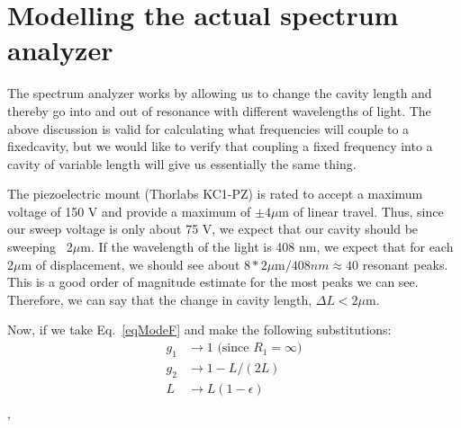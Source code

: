 \section{Modelling the actual spectrum analyzer}

The spectrum analyzer works by allowing us to change the cavity length and thereby go into and out of resonance with different wavelengths of light. The above discussion is valid for calculating what frequencies will couple to a fixedcavity, but we would like to verify that coupling a fixed frequency into a cavity of variable length will give us essentially the same thing.


The piezoelectric mount (Thorlabs KC1-PZ) is rated to accept a maximum voltage of 150 V and provide a maximum of $\pm4\mu$m of linear travel. Thus, since our sweep voltage is only about 75 V, we expect that our cavity should be sweeping ~2$\mu$m. If the wavelength of the light is 408 nm, we expect that for each 2$\mu$m of displacement, we should see about $8*2\mu$m$/408nm \approx 40$ resonant peaks. This is a good order of magnitude estimate for the most peaks we can see. Therefore, we can say that the change in cavity length, $\Delta L< 2\mu$m.

Now, if we take Eq.\ \ref{eqModeF} and make the following substitutions:
\begin{align}
g_1&\rightarrow1 \text{ (since $R_1=\infty$)} \\
g_2&\rightarrow 1-L/(2L)\\
L&\rightarrow L(1-\epsilon)\\
\end{align},

